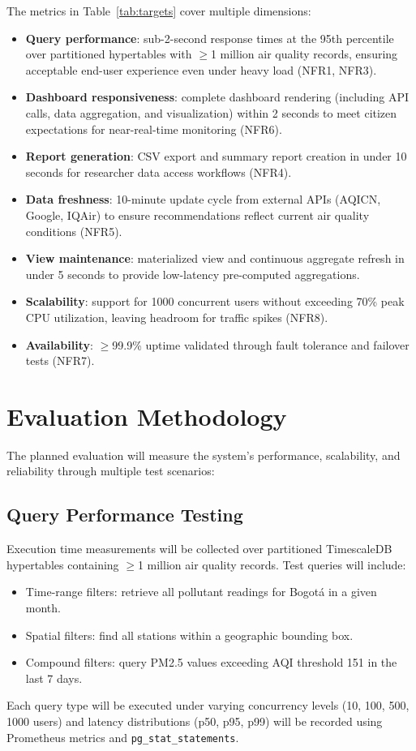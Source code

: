 The metrics in Table~\ref{tab:targets} cover multiple dimensions:
\begin{itemize}
    \item \textbf{Query performance}: sub-2-second response times at the 95th percentile over partitioned hypertables with $\geq$1 million air quality records, ensuring acceptable end-user experience even under heavy load (NFR1, NFR3).
    \item \textbf{Dashboard responsiveness}: complete dashboard rendering (including API calls, data aggregation, and visualization) within 2 seconds to meet citizen expectations for near-real-time monitoring (NFR6).
    \item \textbf{Report generation}: CSV export and summary report creation in under 10 seconds for researcher data access workflows (NFR4).
    \item \textbf{Data freshness}: 10-minute update cycle from external APIs (AQICN, Google, IQAir) to ensure recommendations reflect current air quality conditions (NFR5).
    \item \textbf{View maintenance}: materialized view and continuous aggregate refresh in under 5 seconds to provide low-latency pre-computed aggregations.
    \item \textbf{Scalability}: support for 1000 concurrent users without exceeding 70\% peak CPU utilization, leaving headroom for traffic spikes (NFR8).
    \item \textbf{Availability}: $\geq$99.9\% uptime validated through fault tolerance and failover tests (NFR7).
\end{itemize}

\section{Evaluation Methodology}
\label{sec:evaluation_methodology}

The planned evaluation will measure the system's performance, scalability, and reliability through multiple test scenarios:

\subsection{Query Performance Testing}
Execution time measurements will be collected over partitioned TimescaleDB hypertables containing $\geq$1 million air quality records. Test queries will include:
\begin{itemize}
    \item Time-range filters: retrieve all pollutant readings for Bogotá in a given month.
    \item Spatial filters: find all stations within a geographic bounding box.
    \item Compound filters: query PM2.5 values exceeding AQI threshold 151 in the last 7 days.
\end{itemize}
Each query type will be executed under varying concurrency levels (10, 100, 500, 1000 users) and latency distributions (p50, p95, p99) will be recorded using Prometheus metrics and \texttt{pg\_stat\_statements}.

